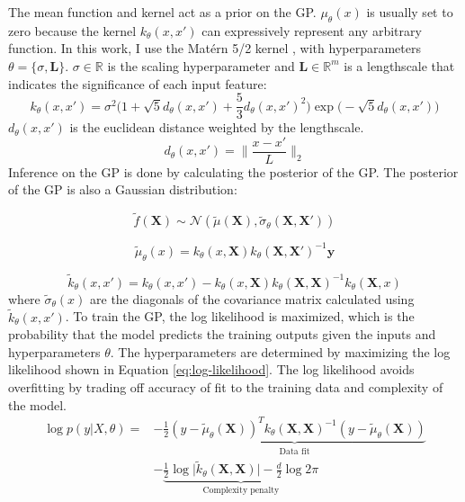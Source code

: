 The mean function and kernel act as a prior on the GP.  $\mu_{\theta}(x)$ is usually set to zero because the kernel  $k_{\theta}(x, x')$ can expressively represent any arbitrary function. In this work, I use the Matérn 5/2 kernel \cite{Rasmussen2006}, with hyperparameters $\theta=\{\sigma,\mathbf L \}$. $\sigma \in \mathbb R$ is the scaling hyperparameter and $\mathbf L \in \mathbb R^m$ is a lengthscale that indicates the significance of each input feature:
\begin{equation}
    k_{\theta}(x, x') = \sigma^2 \biggl(1 + \sqrt{5}d_{\theta}(x,x')+\frac{5}{3}d_{\theta}(x,x')^2\biggr)\exp\biggl(-\sqrt{5}d_{\theta}(x,x') \biggr)
\end{equation}
$d_{\theta}(x,x')$ is the euclidean distance weighted by the lengthscale.
\begin{equation}
    d_{\theta}(x,x')=\biggl\lVert \frac{x-x'}{L} \biggr\rVert_2
\end{equation}
Inference on the GP is done by calculating the posterior of the GP. The posterior of the GP is also a Gaussian distribution:

\begin{equation}
     \tilde f(\mathbf X) \sim \mathcal N(\tilde \mu(\mathbf X), \tilde \sigma_{\theta}(\mathbf X, \mathbf X'))
\end{equation}

\begin{equation}
    \tilde \mu_{\theta}(x) = k_{\theta}(x, \mathbf X)k_{\theta}(\mathbf X, \mathbf X')^{-1} \mathbf y
\end{equation}

\begin{equation}
    \tilde k_{\theta}(x,x') = k_{\theta}( x, x')-k_{\theta}(x, \mathbf X) k_{\theta}(\mathbf X, \mathbf X)^{-1}k_{\theta}(\mathbf X, x)
\end{equation}
where $\tilde \sigma_{\theta}(x)$ are the diagonals of the covariance matrix calculated using $\tilde k_{\theta}(x, x')$.
To train the GP, the log likelihood is maximized, which is the probability that the model predicts the training outputs given the inputs and hyperparameters $\theta$. The hyperparameters are determined by maximizing the log likelihood  shown in Equation \ref{eq:log-likelihood}.  The log likelihood avoids overfitting by trading off accuracy of fit to the training data and complexity of the model.
\begin{equation}
\begin{split}
    \log p(y \vert X, \theta) = & -\underbrace{\frac{1}{2}(y-\tilde \mu_{\theta}(\mathbf X))^T k_{\theta}(\mathbf X, \mathbf X)^{-1}(y- \tilde\mu_{\theta}(\mathbf X)) }_{\text{Data  fit}} \\
    & - \underbrace{\frac{1}{2} \log{\vert \tilde k_{\theta}(\mathbf X, \mathbf X) \vert} - \frac{d}{2}\log{2 \pi}}_{\text{Complexity penalty}}
\end{split}
\label{eq:log-likelihood}
\end{equation}

